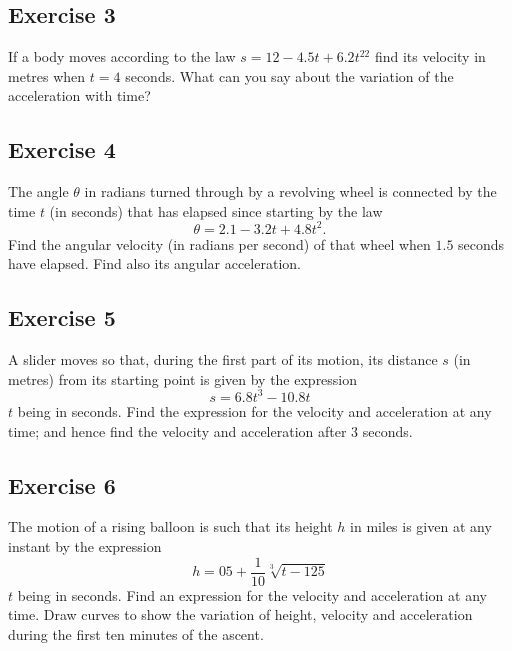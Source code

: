 \documentclass[
  11pt,
  oneside]{book}
\newcommand{\slide}{}
\theoremstyle{definition}
\theoremstyle{definition}
\theoremstyle{definition}
\theoremstyle{definition}
\theoremstyle{remark}
\begin{document}
\subsection*{Exercise 3}\label{exercise-3-2}

If a body moves according to the law \(s = 12 - 4.5t + 6.2t^22\) find its velocity in metres when \(t = 4\) seconds. What can you say about the variation of the acceleration with time?

\slide

\subsection*{Exercise 4}\label{exercise-4-2}

The angle \(\theta\) in radians turned through by a revolving wheel is connected by the time \(t\) (in seconds) that has elapsed since starting by the law
\[
\theta = 2.1 - 3.2t + 4.8t^2.
\]
Find the angular velocity (in radians per second) of that wheel when \(1.5\) seconds have elapsed. Find also its angular acceleration.

\slide

\subsection*{Exercise 5}\label{exercise-5-1}

A slider moves so that, during the first part of its motion, its distance \(s\) (in metres) from its starting point is given by the expression
\[
s = 6.8t^3 - 10.8t
\]
\(t\) being in seconds. Find the expression for the velocity and acceleration at any time; and hence find the velocity and acceleration after \(3\) seconds.

\slide

\subsection*{Exercise 6}\label{exercise-6-1}

The motion of a rising balloon is such that its height \(h\) in miles is given at any instant by the expression
\[
h = 05+ \frac1{10}\sqrt[3]{t-125}
\]
\(t\) being in seconds. Find an expression for the velocity and acceleration at any time. Draw curves to show the variation of height, velocity and acceleration during the first ten minutes of the ascent.
\end{document}

